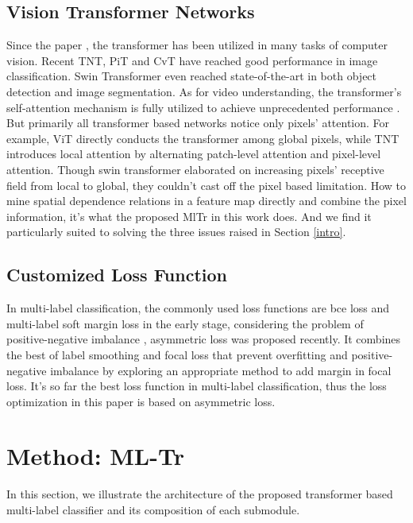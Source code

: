 \documentclass{article} \usepackage[numbers,sort&compress]{natbib}
\begin{document}
\subsection{Vision Transformer Networks}
Since the paper \cite{dosovitskiy2020image}, the transformer has been utilized in many tasks of computer vision. Recent TNT, PiT and CvT \cite{han2021transformer,wu2021cvt,you2020cross,yuan2021tokens,heo2021rethinking,touvron2020training} have reached good performance in image classification. Swin Transformer \cite{liu2021swin,zhu2020deformable,carion2020end} even reached state-of-the-art in both object detection and image segmentation. As for video understanding, the transformer's self-attention mechanism is fully utilized to achieve unprecedented performance \cite{bertasius2021space,neimark2021video}. But primarily all transformer based networks notice only pixels' attention. For example, ViT directly conducts the transformer among global pixels, while TNT introduces local attention by alternating patch-level attention and pixel-level attention. Though swin transformer elaborated on increasing pixels' receptive field from local to global, they couldn't cast off the pixel based limitation. How to mine spatial dependence relations in a feature map directly and combine the pixel information, it's what the proposed MlTr in this work does. And we find it particularly suited to solving the three issues raised in Section \ref{intro}.

\subsection{Customized Loss Function}
In multi-label classification, the commonly used loss functions are bce loss and multi-label soft margin loss \cite{patterson2016coco} in the early stage, considering the problem of positive-negative imbalance \cite{lin2017focal}, asymmetric loss \cite{ben2020asymmetric} was proposed recently. It
combines the best of label smoothing \cite{muller2019does} and focal loss \cite{lin2017focal} that prevent overfitting and positive-negative imbalance by exploring an appropriate method to add margin in focal loss. It's so far the best loss function in multi-label classification, thus the loss optimization in this paper is based on asymmetric loss.



\section{Method: ML-Tr}
\label{method}
In this section, we illustrate the architecture of the proposed transformer based multi-label classifier and its composition of each submodule.
\end{document}
